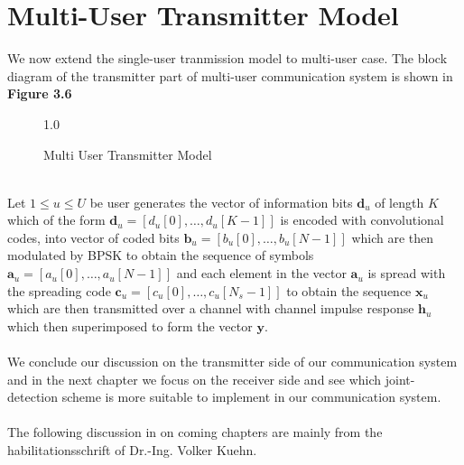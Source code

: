 \section{Multi-User Transmitter Model}
We now extend the single-user tranmission model to multi-user case. The block diagram of the transmitter part of multi-user communication system is shown in \textbf{Figure 3.6}
\begin{figure}[htb]
\centerline{  {1.0} }
\caption{Multi User Transmitter Model}
\end{figure}\\
Let $1\leq u \leq U$ be user generates the vector of information bits $\mathrm{\mathbf{d}}_u$ of length $K$ which of the form $\mathrm{\mathbf{d}}_u=[d_u[0],\dots,d_u[K-1]]$ is encoded with convolutional codes, into vector of coded bits $\mathrm{\mathbf{b}}_u=[b_u[0],\dots,b_u[N-1]]$ which are then modulated by BPSK to obtain the sequence of symbols $\mathrm{\mathbf{a}}_u=[a_u[0],\dots,a_u[N-1]]$ and each element in the vector $\mathrm{\mathbf{a}}_u$ is spread with the spreading code $\mathrm{\mathbf{c}}_u=[c_u[0],\dots,c_u[N_s-1]]$ to obtain the sequence $\mathrm{\mathbf{x}}_u$ which are then transmitted over a channel with channel impulse response $\mathrm{\mathbf{h}}_u$ which then superimposed to form the vector $\mathrm{\mathbf{y}}$. \\ \\
We conclude our discussion on the transmitter side of our communication system and in the next chapter we focus on the receiver side and see which joint-detection scheme is more suitable to implement in our communication system.\\ \\
The following discussion in on coming chapters are mainly from the habilitationsschrift \cite{K05} of Dr.-Ing. Volker Kuehn.

